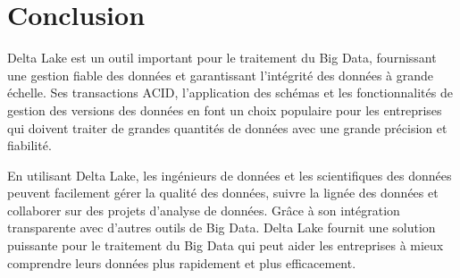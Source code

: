 \section*{Conclusion}

Delta Lake est un outil important pour le traitement du Big Data, fournissant une gestion fiable des données et garantissant l'intégrité des données à grande échelle. Ses transactions ACID, l'application des schémas et les fonctionnalités de gestion des versions des données en font un choix populaire pour les entreprises qui doivent traiter de grandes quantités de données avec une grande précision et fiabilité.

En utilisant Delta Lake, les ingénieurs de données et les scientifiques des données peuvent facilement gérer la qualité des données, suivre la lignée des données et collaborer sur des projets d'analyse de données. Grâce à son intégration transparente avec d'autres outils de Big Data. Delta Lake fournit une solution puissante pour le traitement du Big Data qui peut aider les entreprises à mieux comprendre leurs données plus rapidement et plus efficacement.